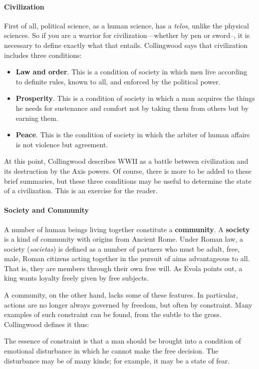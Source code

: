\paragraph{Civilization}
First of all, political science, as a human science, has a \emph{telos}, unlike the physical sciences. So if you are a warrior for civilization—whether by pen or sword–, it is necessary to define exactly what that entails. Collingwood says that civilization includes three conditions:

\begin{itemize}
\item \textbf{Law and order}. This is a condition of society in which men live according to definite rules, known to all, and enforced by the political power. 
\item \textbf{Prosperity}. This is a condition of society in which a man acquires the things he needs for sustenance and comfort not by taking them from others but by earning them. 
\item \textbf{Peace}. This is the condition of society in which the arbiter of human affairs is not violence but agreement. 
\end{itemize}
At this point, Collingwood describes WWII as a battle between civilization and its destruction by the Axis powers. Of course, there is more to be added to these brief summaries, but these three conditions may be useful to determine the state of a civilization. This is an exercise for the reader.

\paragraph{Society and Community}
A number of human beings living together constitute a \textbf{community}. A \textbf{society} is a kind of community with origins from Ancient Rome. Under Roman law, a society (\emph{societas}) is defined as a number of partners who must be adult, free, male, Roman citizens acting together in the pursuit of aims advantageous to all. That is, they are members through their own free will. As Evola points out, a king wants loyalty freely given by free subjects.

A community, on the other hand, lacks some of these features. In particular, actions are no longer always governed by freedom, but often by constraint. Many examples of such constraint can be found, from the subtle to the gross. Collingwood defines it thus:

\begin{quotex}
The essence of constraint is that a man should be brought into a condition of emotional disturbance in which he cannot make the free decision. The disturbance may be of many kinds; for example, it may be a state of fear. 

\end{quotex}
